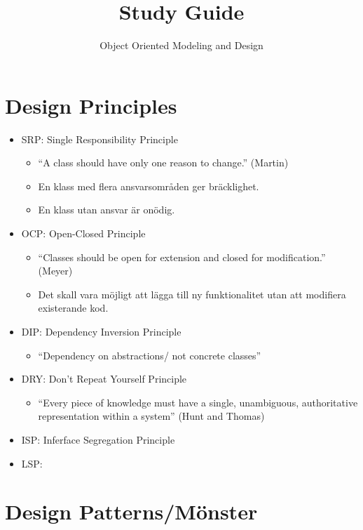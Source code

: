 \documentclass[11pt]{amsart}
\title{Study Guide}
\author{Object Oriented Modeling and Design}
\begin{document}
\maketitle
\lstset{language=Java}

\section*{Design Principles}

\begin{itemize}
\item SRP: Single Responsibility Principle
	\begin{itemize}
	  \item ``A class should have only one reason to change.'' (Martin)
	  \item En klass med flera ansvarsområden ger bräcklighet.
	  \item En klass utan ansvar är onödig.
	\end{itemize}
\item OCP: Open-Closed Principle
	\begin{itemize}
	  \item ``Classes should be open for extension and closed for modification.''
	  (Meyer)
	  \item Det skall vara möjligt att lägga till ny funktionalitet utan att
	  modifiera existerande kod.
	\end{itemize}
\item DIP: Dependency Inversion Principle %
	\begin{itemize}
	  \item ``Dependency on abstractions/ not concrete classes''
	\end{itemize}
\item DRY: Don't Repeat Yourself Principle
	\begin{itemize}
	  \item ``Every piece of knowledge must have a single, unambiguous,
	  authoritative representation within a system'' (Hunt and Thomas)
	\end{itemize}
\item ISP: Inferface Segregation Principle
\item LSP: 
\end{itemize}

\section*{Design Patterns/Mönster}
\end{document}
